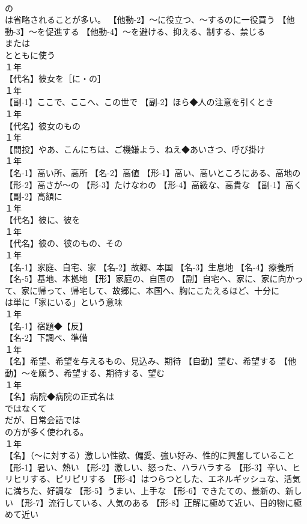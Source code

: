 \documentclass[8pt]{extreport}
\begin{document}
\begin{CJK}{UTF8}{min}
\\	の 
\\	は省略されることが多い。 【他動-2】～に役立つ、～するのに一役買う 【他動-3】～を促進する 【他動-4】～を避ける、抑える、制する、禁じる
\\	または 
\\	とともに使う
\\	１年	
\\	【代名】彼女を［に・の］
\\	１年	
\\	【副-1】ここで、ここへ、この世で 【副-2】ほら◆人の注意を引くとき
\\	１年	
\\	【代名】彼女のもの
\\	１年	
\\	【間投】やあ、こんにちは、ご機嫌よう、ねえ◆あいさつ、呼び掛け
\\	１年	
\\	【名-1】高い所、高所 【名-2】高値 【形-1】高い、高いところにある、高地の 【形-2】高さが～の 【形-3】たけなわの 【形-4】高級な、高貴な 【副-1】高く 【副-2】高額に
\\	１年	
\\	【代名】彼に、彼を
\\	１年	
\\	【代名】彼の、彼のもの、その
\\	１年	
\\	【名-1】家庭、自宅、家 【名-2】故郷、本国 【名-3】生息地 【名-4】療養所 【名-5】基地、本拠地 【形】家庭の、自国の 【副】自宅へ、家に、家に向かって、家に帰って、帰宅して、故郷に、本国へ、胸にこたえるほど、十分に
\\	は単に「家にいる」という意味
\\	１年	
\\	【名-1】宿題◆【反】
\\	【名-2】下調べ、準備
\\	１年	
\\	【名】希望、希望を与えるもの、見込み、期待 【自動】望む、希望する 【他動】～を願う、希望する、期待する、望む
\\	１年	
\\	【名】病院◆病院の正式名は 
\\	ではなくて 
\\	だが、日常会話では 
\\	の方が多く使われる。
\\	１年	
\\	【名】（～に対する）激しい性欲、偏愛、強い好み、性的に興奮していること 【形-1】暑い、熱い 【形-2】激しい、怒った、ハラハラする 【形-3】辛い、ヒリヒリする、ピリピリする 【形-4】はつらつとした、エネルギッシュな、活気に満ちた、好調な 【形-5】うまい、上手な 【形-6】できたての、最新の、新しい 【形-7】流行している、人気のある 【形-8】正解に極めて近い、目的物に極めて近い

\end{CJK}
\end{document}
